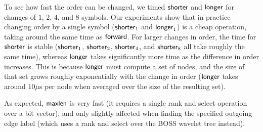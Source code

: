 To see how fast the order can be changed, we timed $\mathsf{shorter}$ and $\mathsf{longer}$ for
changes of $1$, $2$, $4$, and $8$ symbols. Our experiments show that in practice changing 
order by a single symbol ($\mathsf{shorter}_1$ and $\mathsf{longer}_1$) is a cheap operation, taking around the
same time as $\mathsf{forward}$. For larger changes in order, the time for $\mathsf{shorter}$ is stable
($\mathsf{shorter}_1$, $\mathsf{shorter}_2$, $\mathsf{shorter}_4$, and $\mathsf{shorter}_8$ all take roughly the same time),
whereas $\mathsf{longer}$ takes significantly more time as the difference in order increases. This is because
$\mathsf{longer}$ must compute a set of nodes, and the size of that set grows roughly exponentially with
the change in order ($\mathsf{longer}$ takes around $10 \mu$s per node when averaged over the size of the resulting set).

As expected, $\mathsf{maxlen}$ is very fast (it requires a single rank and select operation
over a bit vector), and only slightly affected when finding the specified outgoing edge label (which
uses a rank and select over the BOSS wavelet tree instead).



